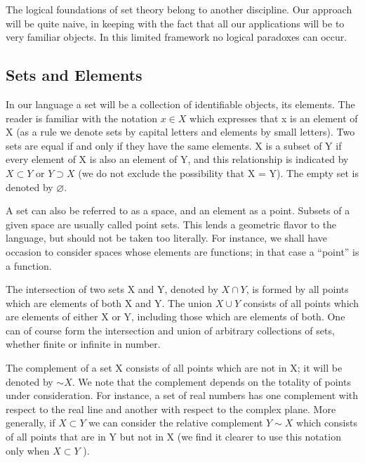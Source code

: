 The logical foundations of set theory belong to another discipline. Our approach will be quite naive, in keeping with the fact that all our applications will be to very familiar objects. In this limited framework no logical paradoxes can occur.

\setcounter{section}{1}\setcounter{subsection}{0}\subsection{Sets and Elements}\label{sec:3.1.1}
In our language a set will be a collection of identifiable objects, its elements. The reader is familiar with the notation $x \in X$ which expresses that x is an element of X (as a rule we denote sets by capital letters and elements by small letters). Two sets are equal if and only if they have the same elements. X is a subset of Y if every element of X is also an element of Y, and this relationship is indicated by $X \subset Y$ or $Y \supset X$ (we do not exclude the possibility that X = Y). The empty set is denoted by $\varnothing$.

A set can also be referred to as a space, and an element as a point. Subsets of a given space are usually called point sets. This lends a geometric flavor to the language, but should not be taken too literally. For instance, we shall have occasion to consider spaces whose elements are functions; in that case a “point” is a function.

The intersection of two sets X and Y, denoted by $X \cap Y$, is formed by all points which are elements of both X and Y. The union $X \cup Y$ consists of all points which are elements of either X or Y, including those which are elements of both. One can of course form the intersection and union of arbitrary collections of sets, whether finite or infinite in number.

The complement of a set X consists of all points which are not in X; it will be denoted by $\sim X$. We note that the complement depends on the totality of points under consideration. For instance, a set of real numbers has one complement with respect to the real line and another with respect to the complex plane. More generally, if $X \subset Y$ we can consider the relative complement $Y \sim X$ which consists of all points that are in Y but not in X (we find it clearer to use this notation only when $X \subset Y$ ).

